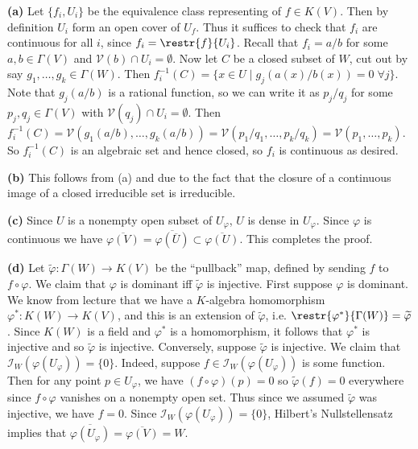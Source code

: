 \documentclass[11pt,letterpaper]{article}
\begin{document}
\begin{solution}
    \textbf{(a)} Let $\{f_i, U_i\}$ be the equivalence class representing of $f\in K(V)$. Then by definition $U_i$ form an open cover of $U_f$. Thus it suffices to check that $f_i$ are continuous for all $i$, since $f_i = \restr{f}{U_i}$. Recall that $f_i = a /b$ for some $a,b\in \Gamma(V)$ and $\mathcal{V}(b)\cap U_i = \emptyset$. Now let $C$ be a closed subset of $W$, cut out by say $g_1,\ldots,g_k\in \Gamma(W)$. Then $f_i^{-1}(C) = \{x\in U \mid g_j(a(x)/b(x)) = 0 \; \forall j\}$. Note that $g_j(a/b)$ is a rational function, so we can write it as $p_j / q_j$ for some $p_j,q_j\in \Gamma(V)$ with $\mathcal{V}(q_j)\cap U_i=\emptyset$. Then $f^{-1}_i(C) = \mathcal{V}(g_1(a/b),\ldots,g_k(a /b))=\mathcal{V}(p_1 /q_1,\ldots,p_k /q_k) = \mathcal{V}(p_1,\ldots,p_k)$. So $f^{-1}_i(C)$ is an algebraic set and hence closed, so $f_i$ is continuous as desired.     
    
    \textbf{(b)} This follows from (a) and due to the fact that the closure of a continuous image of a closed irreducible set is irreducible. 
    
    \textbf{(c)} Since $U$ is a nonempty open subset of $U_\varphi$, $U$ is dense in $U_\varphi$. Since $\varphi$ is continuous we have $\overline{\varphi(V)}=\overline{\varphi(\overline{U})}\subset \overline{\varphi(U)}$. This completes the proof.
    
    \textbf{(d)} Let $\widetilde{\varphi} : \Gamma(W) \to K(V)$ be the ``pullback'' map, defined by sending $f$ to $f\circ \varphi$. We claim that $\varphi$ is dominant iff $\widetilde{\varphi}$ is injective. First suppose $\varphi$ is dominant. We know from lecture that we have a $K$-algebra homomorphism $\varphi^* : K(W) \to K(V)$, and this is an extension of $\widetilde{\varphi}$, i.e. $\restr{\varphi^*}{\Gamma(W)} = \widetilde{\varphi}$. Since $K(W)$ is a field and $\varphi^*$ is a homomorphism, it follows that $\varphi^*$ is injective and so $\widetilde{\varphi}$ is injective. Conversely, suppose $\widetilde{\varphi}$ is injective. We claim that $\mathcal{I}_W(\varphi(U_\varphi))=\{0\}$. Indeed, suppose $f\in \mathcal{I}_W(\varphi(U_\varphi))$ is some function. Then for any point $p\in U_\varphi$, we have $(f\circ \varphi)(p)=0$ so $\widetilde{\varphi}(f)=0$ everywhere since $f\circ\varphi$ vanishes on a nonempty open set. Thus since we assumed $\widetilde{\varphi}$ was injective, we have $f=0$. Since $\mathcal{I}_W(\varphi(U_\varphi))=\{0\}$, Hilbert's Nullstellensatz implies that $\overline{\varphi(U_\varphi)}=\overline{\varphi(V)}=W$.
\end{solution}
\end{document}

